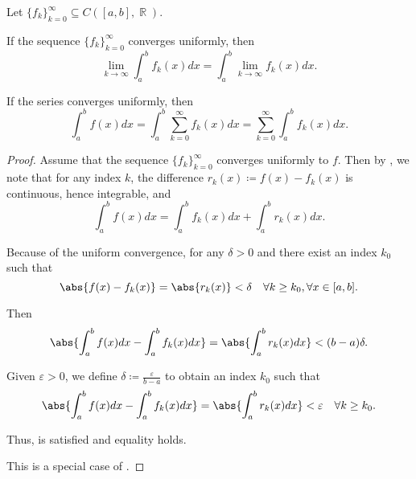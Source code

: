 \begin{corollary}\label{thm:riemann_intergral_limit_exchange}
  Let \( \{ f_k \}_{k=0}^\infty \subseteq C([a, b], \BbbR) \).

  \begin{thmenum}
     If the sequence \( \{ f_k \}_{k=0}^\infty \) converges uniformly, then
    \begin{equation*}
      \lim_{k \to \infty} \int_a^b f_k(x) dx = \int_a^b \lim_{k \to \infty} f_k(x) dx.
    \end{equation*}

     If the series  converges uniformly, then
    \begin{equation*}
      \int_a^b f(x) dx = \int_a^b \sum_{k=0}^\infty f_k(x) dx = \sum_{k=0}^\infty \int_a^b f_k(x) dx.
    \end{equation*}
  \end{thmenum}
\end{corollary}
\begin{proof}
   Assume that the sequence \( \{ f_k \}_{k=0}^\infty \) converges uniformly to \( f \). Then by , we note that for any index \( k \), the difference \( r_k(x) \coloneqq f(x) - f_k(x) \) is continuous, hence integrable, and
  \begin{equation*}
    \int_a^b f(x) dx = \int_a^b f_k(x) dx + \int_a^b r_k(x) dx.
  \end{equation*}

  Because of the uniform convergence, for any \( \delta > 0 \) and there exist an index \( k_0 \) such that
  \begin{equation*}
    \abs{f(x) - f_k(x)} = \abs{r_k(x)} < \delta \quad\forall k \geq k_0, \forall x \in [a, b].
  \end{equation*}

  Then
  \begin{equation*}
    \abs{\int_a^b f(x) dx - \int_a^b f_k(x) dx} = \abs{\int_a^b r_k(x) dx} < (b - a) \delta.
  \end{equation*}

  Given \( \varepsilon > 0 \), we define \( \delta \coloneqq \frac \varepsilon {b - a} \) to obtain an index \( k_0 \) such that
  \begin{equation*}
    \abs{\int_a^b f(x) dx - \int_a^b f_k(x) dx} = \abs{\int_a^b r_k(x) dx} < \varepsilon \quad\forall k \geq k_0.
  \end{equation*}

  Thus,  is satisfied and equality holds.

   This is a special case of .
\end{proof}

